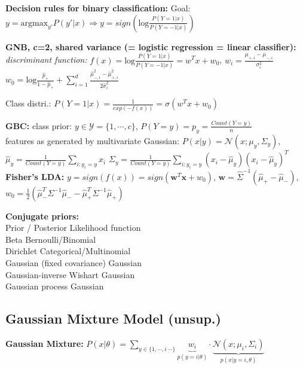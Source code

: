     \textbf{Decision rules for binary classification:} Goal: $y = \mathrm{argmax}_{y'} P(y'|x) \Rightarrow y = sign(\mathrm{log} \frac{P(Y=1|x)}{P(Y=-1|x)})$

    \textbf{GNB, c=2, shared variance (= logistic regression = linear classifier):} \textit{discriminant function:} $f(x)=\mathrm{log} \frac{P(Y=1|x)}{P(Y=-1|x)} = w^Tx + w_0$,
    $w_i = \frac{\mu_{+, i} - \mu_{-, i}}{\sigma_{i}^2}$
    $w_0 = \mathrm{log} \frac{\hat{p}_+}{1-\hat{p}_+} + \sum_{i=1}^d \frac{\hat{\mu}_{-, i}^2 - \hat{\mu}_{+, i}^2}{2\hat{\sigma}_i^2}$

    Class distri.: $P(Y=1|x) = \frac{1}{exp(-f(x))} = \sigma (w^Tx+w_0)$

    \textbf{GBC:}
    class prior: $y \in \mathcal{Y} = \{1, \cdots , c \}$, $P(Y=y) = p_y = \frac{Count(Y=y)}{n}$ \\
    features as generated by multivariate Gaussian: $P(x|y) = \mathcal{N}(x;\mu_{y}, \Sigma_{y})$, 
    $\hat{\mu}_{y} = \frac{1}{Count(Y=y)} \sum_{i: y_i=y} x_{i}$
    $\Sigma_{y} = \frac{1}{Count(Y=y)} \sum_{i: y_i=y} (x_{i} - \hat{\mu}_{y})(x_{i} - \hat{\mu}_{y})^T$\\

    \textbf{Fisher's LDA:} $y = sign(f(x)) = sign(\boldsymbol{w}^T\boldsymbol{x} + w_0)$, $\boldsymbol{w} = \hat{\Sigma}^{-1} (\hat{\mu}_+ - \hat{\mu}_-)$, $w_0 = \frac{1}{2} (\hat{\mu}_-^T \Sigma^{-1} \hat{\mu}_- - \hat{\mu}_+^T \Sigma^{-1} \hat{\mu}_+)$

    \textbf{Conjugate priors:} \\
    Prior / Posterior \qquad Likelihood function\\
    Beta \qquad \qquad \qquad Bernoulli/Binomial\\
    Dirichlet \qquad \qquad Categorical/Multinomial\\
    Gaussian (fixed covariance) \qquad  Gaussian\\
    Gaussian-inverse Wishart \qquad  Gaussian\\
    Gaussian process \qquad  \qquad Gaussian\\


 \subsection{Gaussian Mixture Model (unsup.)}
    \textbf{Gaussian Mixture:} $P(x|\theta) = \sum_{y \in \{1, \cdots, i\ \cdots \}} \underbrace{w_i}_{p(y=i|\theta)}\cdot\underbrace{\mathcal{N}(x;\mu_i,\Sigma_i)}_{p(x|y=i,\theta)}$
    \vspace{-0.3cm}
    
